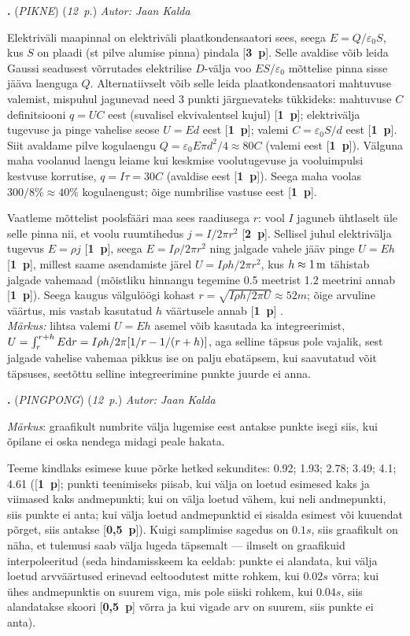 \documentclass[11pt,a5paper]{article}
\newcommand{\numb}[1]{\vspace{5pt}\textbf{\large #1}}
\newcommand{\nimi}[1]{(\textsl{\small #1})}
\newcommand{\punktid}[1]{(\emph{#1~p.})}
\newcommand{\p}[1]{[\textbf{#1~p}]}
\newcounter{ylesanne}
\newcommand{\yl}[1]{\addtocounter{ylesanne}{1}\numb{\theylesanne.} \nimi{#1} \newblock{}}
\newcommand{\autor}[1]{\emph{Autor: #1}}%
\begin{document}
\yl{PIKNE}
\punktid{12} \autor{Jaan Kalda}

\osa Elektriväli maapinnal on elektriväli plaatkondensaatori sees, seega $E=Q/\varepsilon_0S$, kus $S$ on plaadi (st pilve alumise pinna) pindala \p3. Selle avaldise võib leida Gaussi seadusest võrrutades elektrilise $D$-välja voo $ES/\varepsilon_0$ mõttelise pinna sisse jääva laenguga $Q$. Alternatiivselt võib selle leida plaatkondensaatori mahtuvuse valemist, mispuhul jagunevad need 3 punkti järgnevateks tükkideks: mahtuvuse $C$ definitsiooni $q=UC$ eest (suvalisel ekvivalentsel kujul) \p1; elektrivälja tugevuse ja pinge vahelise seose $U=Ed$ eest \p1; valemi $C=\varepsilon_0S/d$ eest \p1. Siit avaldame pilve kogulaengu $Q=\varepsilon_0E\pi d^2/4\approx\SI{80}C$ (valemi eest \p1). Välguna maha voolanud laengu leiame kui keskmise voolutugevuse ja vooluimpulsi kestvuse korrutise, $q=I\tau=\SI{30}C$ (avaldise eest \p1). Seega maha voolas $300/8\%\approx 40\%$ kogulaengust; õige numbrilise vastuse eest \p1.

\osa Vaatleme mõttelist poolsfääri maa sees raadiusega $r$: vool $I$ jaguneb ühtlaselt üle selle pinna nii, et voolu ruumtihedus $j=I/2\pi r^2$ \p2. Sellisel juhul elektrivälja tugevus $E=\rho j$ \p1, seega $E=I\rho/2\pi r^2$ ning jalgade vahele jääv pinge $U=Eh$ \p1, millest saame asendamiste järel $U=I\rho h/2\pi r^2$, kus $h\approx\SI 1m$ tähistab jalgade vahemaad (mõistliku hinnangu tegemine \num{0.5} meetrist \num{1.2} meetrini annab \p1). Seega kaugus välgulöögi kohast $r=\sqrt{I\rho h/2\pi U}\approx\SI{52}m$; õige arvuline väärtus, mis vastab kasutatud $h$ väärtusele annab \p1 .
\\\emph{Märkus:} lihtsa valemi $U=Eh$ asemel võib kasutada ka integreerimist, $U=\int_r^{r+h} E\textrm dr=I\rho h/2\pi[1/r-1/(r+h)]$, aga selline täpsus pole vajalik, sest jalgade vahelise vahemaa pikkus ise on palju ebatäpsem, kui saavutatud võit täpsuses, seetõttu selline integreerimine punkte juurde ei anna.

\newpage
\yl{PINGPONG}
\punktid{12} \autor{Jaan Kalda}

\emph{Märkus}: graafikult numbrite välja lugemise eest antakse punkte isegi siis, kui õpilane ei oska nendega midagi peale hakata.

\osa Teeme kindlaks esimese kuue põrke hetked sekundites: \num{0,92}; \num{1,93}; \num{2,78}; \num{3,49}; \num{4,1}; \num{4.61} (\p1; punkti teenimiseks piisab, kui välja on loetud esimesed kaks ja viimased kaks andmepunkti; kui on välja loetud vähem, kui neli andmepunkti, siis punkte ei anta; kui välja loetud andmepunktid ei sisalda esimest või kuuendat põrget, siis antakse \p{0,5}). Kuigi samplimise sagedus on $\SI{0.1}s$, siis graafikult on näha, et tulemusi saab välja lugeda täpsemalt --- ilmselt on graafikuid interpoleeritud (seda hindamisskeem ka eeldab: punkte ei alandata, kui välja loetud arvväärtused erinevad eeltoodutest mitte rohkem, kui $\SI{0.02}s$ võrra; kui ühes andmepunktis on suurem viga, mis pole siiski rohkem, kui  $\SI {0.04}s$, siis alandatakse skoori \p{0,5} võrra ja kui vigade arv on suurem, siis punkte ei anta).
\end{document}
